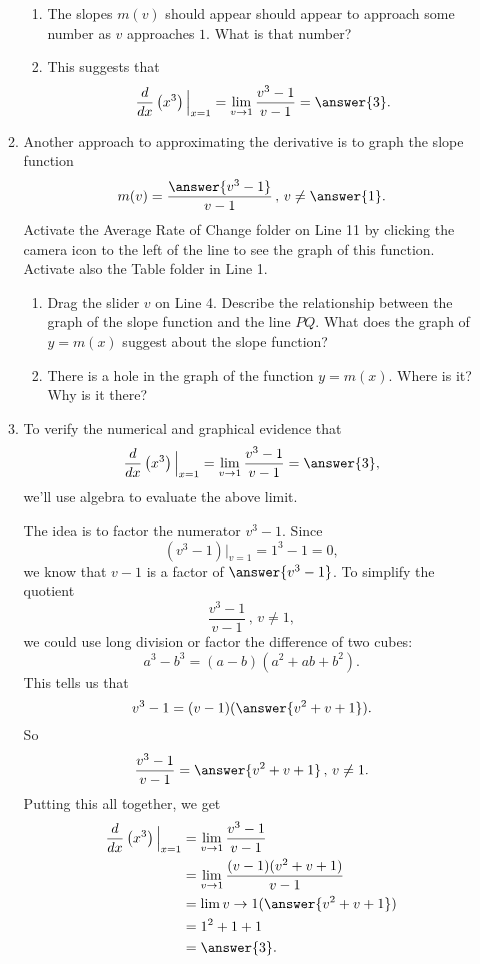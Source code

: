 \documentclass{ximera}
\begin{document}
\begin{exploration}
\begin{enumerate}
\begin{enumerate}
\begin{enumerate}
\item The slopes $m(v)$ should appear should appear to approach some number as $v$ approaches $1$. What is that number?

\item This suggests that 
\[
   \frac{d}{dx}\left( x^3 \right)\Big|_{x=1}  = \lim_{v\to 1} \frac{v^3-1}{v-1} = \answer{3} .
\] 
\end{enumerate}

\item Another approach to approximating the derivative is to graph the slope function
\[
    m(v) = \frac{\answer{v^3-1}}{v-1} \, , \, v\neq \answer{1}.
\]
Activate the Average Rate of Change folder on Line 11 by clicking the camera icon to the left of the line to see the graph of this function. Activate also the Table folder in Line 1.

\begin{enumerate}
\item Drag the slider $v$ on Line 4. Describe the relationship between the graph of the slope function and the line $PQ$. What does the graph of $y=m(x)$ suggest about the slope function?

\item There is a hole in the graph of the function $y=m(x)$. Where is it? Why is it there?

\end{enumerate}

\item To verify the numerical and graphical evidence that %
\[
     \frac{d}{dx}\left( x^3 \right)\Big|_{x=1}  = \lim_{v\to 1} \frac{v^3-1}{v-1}  =\answer{3} ,
\]
we'll use algebra to evaluate the above limit. 

The idea is to factor the numerator $v^3-1$. Since 
\[
     (v^3 - 1)\Big|_{v=1} = 1^3 - 1 = 0 ,
\]
we know that $v-1$ is a factor of $\answer{v^3-1}$. To simplify the quotient
\[
  \frac{v^3-1}{v-1} \, , \, v\neq 1,
\]
we could use long division or factor the difference of two cubes:
\[
   a^3 - b^3 = (a-b)(a^2 + ab + b^2).
\]
This tells us that
\[
     v^3 - 1 = (v-1)(\answer{v^2 + v + 1}).
\]
So
\[
   \frac{v^3-1}{v-1} = \answer{v^2+v+1} \, , \, v\neq 1.
\]
Putting this all together, we get
\begin{align*}
\frac{d}{dx}\left( x^3 \right)\Big|_{x=1}  & = \lim_{v\to 1} \frac{v^3-1}{v-1} \\
                                                              &= \lim_{v\to 1} \frac{(v-1)(v^2+v+1)}{v-1} \\
                                                             & = \lim {v\to 1}(\answer{v^2 + v + 1}) \\
                                                            & = 1^2 + 1 + 1 \\
                                                            & = \answer{3} .
\end{align*}
\end{enumerate}

\end{enumerate}
\end{exploration}
\end{document}
